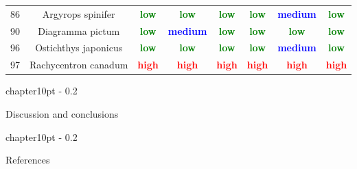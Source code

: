 \documentclass{report}\usepackage[]{graphicx}\usepackage[]{color}
\makeatletter
\renewcommand\chapter{\@startsection%
{chapter}{1}{0pt}%
{-\baselineskip}%
{0.2\baselineskip}%
{\raggedright\bf}}%
\makeatother
\begin{document}
\begin{table}[ht]
{\begin{tabular}{cccccccc}
   86 & Argyrops spinifer & \textcolor{green}{\textbf{low}} & \textcolor{green}{\textbf{low}} & \textcolor{green}{\textbf{low}} & \textcolor{green}{\textbf{low}} & \textcolor{blue}{\textbf{medium}} & \textcolor{green}{\textbf{low}} \\ 
   90 & Diagramma pictum & \textcolor{green}{\textbf{low}} & \textcolor{blue}{\textbf{medium}} & \textcolor{green}{\textbf{low}} & \textcolor{green}{\textbf{low}} & \textcolor{green}{\textbf{low}} & \textcolor{green}{\textbf{low}} \\ 
   96 & Ostichthys japonicus & \textcolor{green}{\textbf{low}} & \textcolor{green}{\textbf{low}} & \textcolor{green}{\textbf{low}} & \textcolor{green}{\textbf{low}} & \textcolor{blue}{\textbf{medium}} & \textcolor{green}{\textbf{low}} \\ 
   97 & Rachycentron canadum & \textcolor{red}{\textbf{high}} & \textcolor{red}{\textbf{high}} & \textcolor{red}{\textbf{high}} & \textcolor{red}{\textbf{high}} & \textcolor{red}{\textbf{high}} & \textcolor{red}{\textbf{high}} \\ 
   \hline
\end{tabular}
}
\end{table}

\clearpage
\newpage

\chapter{Discussion and conclusions}


\newpage

\chapter{References}

\end{document}
